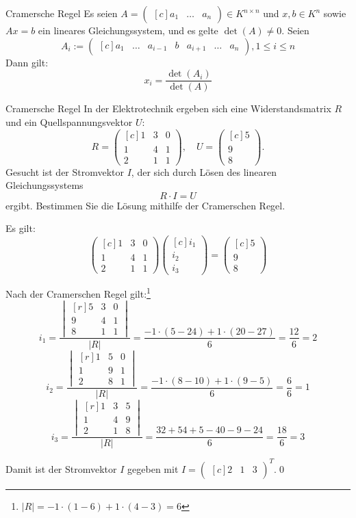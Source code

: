 \documentclass[german]{../spicker}
\newcommand{\vektor}[1]{\begin{pmatrix*}[c] #1 \end{pmatrix*}}
\renewcommand{\abs}[1]{\left| #1 \right|}
\newcommand{\dvektor}[1]{\begin{vmatrix*}[r] #1 \end{vmatrix*}}
\begin{document}
\begin{defi}{Cramersche Regel}
    Es seien $A = \vektor{a_1 & \ldots & a_n} \in K^{n\times n}$ und $x, b \in K^n$ sowie $Ax=b$ ein lineares Gleichungssystem, und es gelte $\det(A) \neq 0$.
    Seien
    $$
        A_i := \vektor{a_1 & \ldots & a_{i-1} & b & a_{i+1} & \ldots & a_n}, 1 \leq i \leq n
    $$
    Dann gilt:
    $$
        x_i = \frac{\det(A_i)}{\det(A)}
    $$
\end{defi}

\begin{example}{Cramersche Regel}
    In der Elektrotechnik ergeben sich eine Widerstandsmatrix $R$ und ein Quellspannungsvektor $U$:
    $$
        R = \vektor{1 & 3 & 0 \\ 1 & 4 & 1 \\ 2 & 1 & 1}, \quad U = \vektor{5 \\ 9 \\ 8}.
    $$
    Gesucht ist der Stromvektor $I$, der sich durch Lösen des linearen Gleichungssystems
    $$
        R \cdot I = U
    $$
    ergibt.
    Bestimmen Sie die Lösung mithilfe der Cramerschen Regel.

    \exampleseparator

    Es gilt:
    $$
        \vektor{1 & 3 & 0 \\ 1 & 4 & 1 \\ 2 & 1 & 1}  \vektor{i_1 \\ i_2 \\ i_3} = \vektor{5 \\ 9 \\ 8}
    $$

    Nach der Cramerschen Regel gilt:\footnote{$\abs{R} = -1 \cdot (1-6) + 1 \cdot (4-3) = 6$}
    $$
        i_1 = \frac{\dvektor{5 & 3 & 0 \\ 9 & 4 & 1 \\ 8 & 1 & 1}}{\abs{R}} = \frac{-1 \cdot (5-24) + 1 \cdot (20-27)}{6} = \frac{12}{6} = 2
    $$
    $$
        i_2 = \frac{\dvektor{1 & 5 & 0 \\ 1 & 9 & 1 \\ 2 & 8 & 1}}{\abs{R}} = \frac{-1 \cdot (8-10) + 1 \cdot (9-5)}{6} = \frac{6}{6} = 1
    $$
    $$
        i_3 = \frac{\dvektor{1 & 3 & 5 \\ 1 & 4 & 9 \\ 2 & 1 & 8}}{\abs{R}} = \frac{32+54+5-40-9-24}{6} = \frac{18}{6} = 3
    $$

    Damit ist der Stromvektor $I$ gegeben mit $I = \vektor{2 & 1 & 3}^T$.\qed
\end{example}
\end{document}
